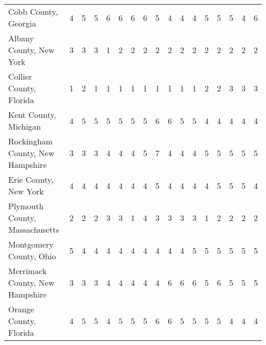 \begin{landscape}
\begin{longtable}{lcccccccccccccccc}
	Cobb County, Georgia & 4 & 5 & 5 & 6 & 6 & 6 & 6 & 5 & 4 & 4 & 4 & 5 & 5 & 5 & 4 & 6 \\
	Albany County, New York & 3 & 3 & 3 & 1 & 2 & 2 & 2 & 2 & 2 & 2 & 2 & 2 & 2 & 2 & 2 & 2 \\
	Collier County, Florida & 1 & 2 & 1 & 1 & 1 & 1 & 1 & 1 & 1 & 1 & 1 & 2 & 2 & 3 & 3 & 3 \\
	Kent County, Michigan & 4 & 5 & 5 & 5 & 5 & 5 & 5 & 6 & 6 & 5 & 5 & 4 & 4 & 4 & 4 & 4 \\
	Rockingham County, New Hampshire & 3 & 3 & 3 & 4 & 4 & 4 & 5 & 7 & 4 & 4 & 4 & 5 & 5 & 5 & 5 & 5 \\
	Erie County, New York & 4 & 4 & 4 & 4 & 4 & 4 & 4 & 5 & 4 & 4 & 4 & 4 & 5 & 5 & 5 & 4 \\
	Plymouth County, Massachusetts & 2 & 2 & 2 & 3 & 3 & 1 & 4 & 3 & 3 & 3 & 3 & 1 & 2 & 2 & 2 & 2 \\
	Montgomery County, Ohio & 5 & 4 & 4 & 4 & 4 & 4 & 4 & 4 & 4 & 4 & 5 & 5 & 5 & 5 & 5 & 5 \\
	Merrimack County, New Hampshire & 3 & 3 & 3 & 4 & 4 & 4 & 4 & 4 & 6 & 6 & 6 & 5 & 6 & 5 & 5 & 5 \\
	Orange County, Florida & 4 & 5 & 5 & 4 & 5 & 5 & 5 & 6 & 6 & 5 & 5 & 5 & 5 & 4 & 4 & 4
	\end{longtable}


\newpage



\end{landscape}
